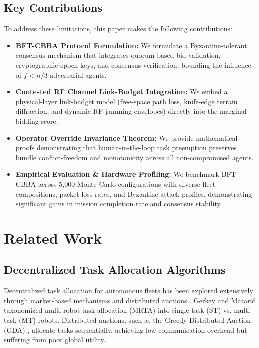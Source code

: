 \documentclass[journal,10pt,twocolumn]{IEEEtran}
\begin{document}
\subsection{Key Contributions}
To address these limitations, this paper makes the following contributions:
\begin{itemize}
    \item \textbf{BFT-CBBA Protocol Formulation:} We formulate a Byzantine-tolerant consensus mechanism that integrates quorum-based bid validation, cryptographic epoch keys, and consensus verification, bounding the influence of $f < n/3$ adversarial agents.
    \item \textbf{Contested RF Channel Link-Budget Integration:} We embed a physical-layer link-budget model (free-space path loss, knife-edge terrain diffraction, and dynamic RF jamming envelopes) directly into the marginal bidding score.
    \item \textbf{Operator Override Invariance Theorem:} We provide mathematical proofs demonstrating that human-in-the-loop task preemption preserves bundle conflict-freedom and monotonicity across all non-compromised agents.
    \item \textbf{Empirical Evaluation & Hardware Profiling:} We benchmark BFT-CBBA across 5,000 Monte Carlo configurations with diverse fleet compositions, packet loss rates, and Byzantine attack profiles, demonstrating significant gains in mission completion rate and consensus stability.
\end{itemize}

\section{Related Work}

\subsection{Decentralized Task Allocation Algorithms}
Decentralized task allocation for autonomous fleets has been explored extensively through market-based mechanisms and distributed auctions \cite{bertsekas1988auction, gerkey2004formal}. Gerkey and Matari{\'c} \cite{gerkey2004formal} taxonomized multi-robot task allocation (MRTA) into single-task (ST) vs. multi-task (MT) robots. Distributed auctions, such as the Greedy Distributed Auction (GDA) \cite{alighanbari2005coordination}, allocate tasks sequentially, achieving low communication overhead but suffering from poor global utility. 
\end{document}
